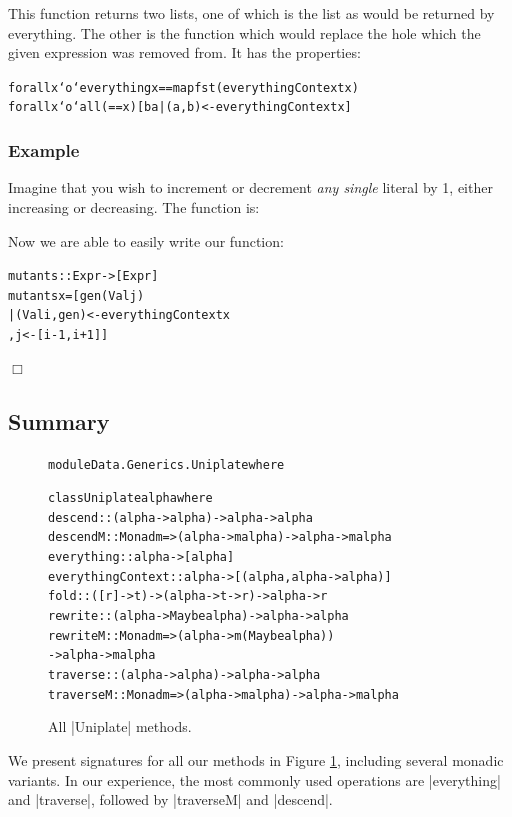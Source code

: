 \documentclass[preprint]{sigplanconf}
\newcounter{exmp}
\newcommand{\yesexample}{\subsubsection*{Example \arabic{exmp}}\refstepcounter{exmp}}
\newcommand{\noexample}{\hfill$\Box$}
\newenvironment{code}{\begin{alltt}\small}{\end{alltt}}
\newenvironment{example}{\yesexample}{\noexample}
\begin{document}
This function returns two lists, one of which is the list as would be returned by everything. The other is the function which would replace the hole which the given expression was removed from. It has the properties:

\begin{code}
forall x `o` everything x == map fst (everythingContext x)
forall x `o` all (== x) [b a | (a,b) <- everythingContext x]
\end{code}

\begin{example}
Imagine that you wish to increment or decrement \textit{any single} literal by 1, either increasing or decreasing. The function is:

Now we are able to easily write our function:

\begin{code}
mutants :: Expr -> [Expr]
mutants x =  [gen (Val j)
             | (Val i, gen) <- everythingContext x
             , j <- [i-1, i+1]]
\end{code}
\end{example}


\subsection{Summary}

\begin{figure}
\begin{code}
module Data.Generics.Uniplate where

class Uniplate alpha where
    descend            :: (alpha -> alpha) -> alpha -> alpha
    descendM           :: Monad m => (alpha -> m alpha) -> alpha -> m alpha
    everything         :: alpha -> [alpha]
    everythingContext  :: alpha -> [(alpha, alpha -> alpha)]
    fold               :: ([r] -> t) -> (alpha -> t -> r) -> alpha -> r
    rewrite            :: (alpha -> Maybe alpha) -> alpha -> alpha
    rewriteM           :: Monad m  => (alpha -> m (Maybe alpha))
                                   -> alpha -> m alpha
    traverse           :: (alpha -> alpha) -> alpha -> alpha
    traverseM          :: Monad m => (alpha -> m alpha) -> alpha -> m alpha
\end{code}
\caption{All |Uniplate| methods.}
\label{fig:play}
\end{figure}

We present signatures for all our methods in Figure \ref{fig:play}, including several monadic variants. In our experience, the most commonly used operations are |everything| and |traverse|, followed by |traverseM| and |descend|.
\end{document}

